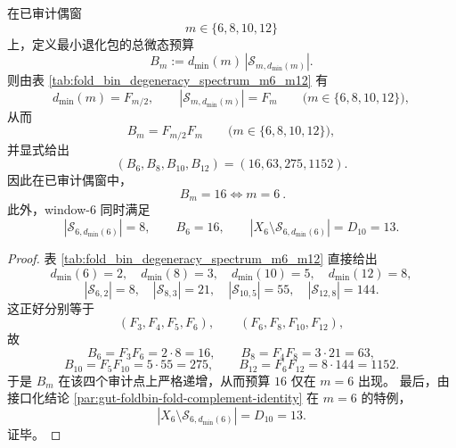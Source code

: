 \begin{theorem}\label{thm:gut-audited-even-windows-unique-budget16-min-sector}
在已审计偶窗
\[
m\in\{6,8,10,12\}
\]
上，定义最小退化包的总微态预算
\[
B_m:=d_{\min}(m)\,|\mathcal S_{m,d_{\min}(m)}|.
\]
则由表 \ref{tab:fold_bin_degeneracy_spectrum_m6_m12} 有
\[
d_{\min}(m)=F_{m/2},
\qquad
|\mathcal S_{m,d_{\min}(m)}|=F_m
\qquad
\bigl(m\in\{6,8,10,12\}\bigr),
\]
从而
\[
B_m=F_{m/2}F_m
\qquad
\bigl(m\in\{6,8,10,12\}\bigr),
\]
并显式给出
\[
(B_6,B_8,B_{10},B_{12})=(16,63,275,1152).
\]
因此在已审计偶窗中，
\[
\boxed{\ B_m=16\iff m=6\ }.
\]
此外，window-\(6\) 同时满足
\[
|\mathcal S_{6,d_{\min}(6)}|=8,
\qquad
B_6=16,
\qquad
|X_6\setminus \mathcal S_{6,d_{\min}(6)}|=D_{10}=13.
\]
\end{theorem}
\begin{proof}
表 \ref{tab:fold_bin_degeneracy_spectrum_m6_m12} 直接给出
\[
d_{\min}(6)=2,\quad d_{\min}(8)=3,\quad d_{\min}(10)=5,\quad d_{\min}(12)=8,
\]
\[
|\mathcal S_{6,2}|=8,\quad |\mathcal S_{8,3}|=21,\quad |\mathcal S_{10,5}|=55,\quad |\mathcal S_{12,8}|=144.
\]
这正好分别等于
\[
(F_3,F_4,F_5,F_6),\qquad (F_6,F_8,F_{10},F_{12}),
\]
故
\[
B_6=F_3F_6=2\cdot 8=16,\qquad
B_8=F_4F_8=3\cdot 21=63,
\]
\[
B_{10}=F_5F_{10}=5\cdot 55=275,\qquad
B_{12}=F_6F_{12}=8\cdot 144=1152.
\]
于是 \(B_m\) 在该四个审计点上严格递增，从而预算 \(16\) 仅在 \(m=6\) 出现。
最后，由接口化结论 \ref{par:gut-foldbin-fold-complement-identity} 在 \(m=6\) 的特例，
\[
|X_6\setminus \mathcal S_{6,d_{\min}(6)}|=D_{10}=13.
\]
证毕。
\end{proof}
